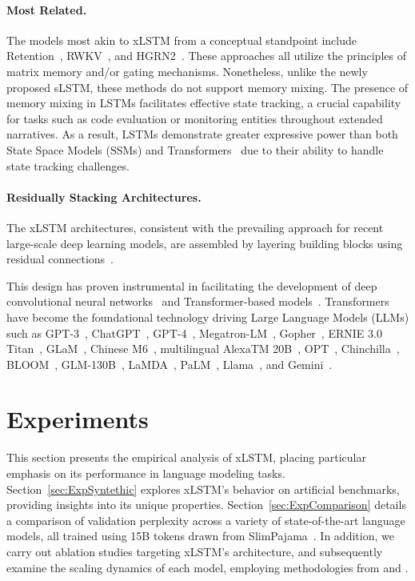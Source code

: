 \paragraph{Most Related.} The models most akin to xLSTM from a conceptual standpoint include Retention~\citep{Sun:23arxiv}, RWKV~\citep{Peng:23arxivshort,Peng:24arxivshort}, and HGRN2~\citep{Qin:24arxiv}. These approaches all utilize the principles of matrix memory and/or gating mechanisms. Nonetheless, unlike the newly proposed sLSTM, these methods do not support memory mixing. The presence of memory mixing in LSTMs facilitates effective state tracking, a crucial capability for tasks such as code evaluation or monitoring entities throughout extended narratives. As a result, LSTMs demonstrate greater expressive power than both State Space Models (SSMs) and Transformers~\citep{Merrill:24,Deletang:23} due to their ability to handle state tracking challenges.

\paragraph{Residually Stacking Architectures.} The xLSTM architectures, consistent with the prevailing approach for recent large-scale deep learning models, are assembled by layering building blocks using residual connections~\citep{Srivastava:15,He:16}.

This design has proven instrumental in facilitating the development of deep convolutional neural networks~\citep{He:16} and Transformer-based models~\citep{Vaswani:17}. Transformers have become the foundational technology driving Large Language Models (LLMs) such as GPT-3~\citep{Brown:20short}, ChatGPT~\citep{Schulman:22short}, GPT-4~\citep{Achiam:23gpt4short}, Megatron-LM~\citep{Shoeybi:19}, Gopher~\citep{Rae:21short}, ERNIE 3.0 Titan~\citep{Wang:21arxivshort}, GLaM~\citep{Du:21glamshort}, Chinese M6~\citep{Lin:21}, multilingual AlexaTM 20B~\citep{Soltan:22}, OPT~\citep{Zhang:22opt}, Chinchilla~\citep{Hoffmann:22short}, BLOOM~\citep{Scao:22arxivshort}, GLM-130B~\citep{Zeng:22arxivshort}, LaMDA~\citep{Thoppilan:22short}, PaLM~\citep{Chowdhery:22short}, Llama~\citep{Touvron:23arxiv}, and Gemini~\citep{GeminiTeam:23arxiv,Reid:24arxiv}.

\section{Experiments}
\label{sec:Exp}

This section presents the empirical analysis of xLSTM, placing particular emphasis on its performance in language modeling tasks. Section~\ref{sec:ExpSyntethic} explores xLSTM's behavior on artificial benchmarks, providing insights into its unique properties. Section~\ref{sec:ExpComparison} details a comparison of validation perplexity across a variety of state-of-the-art language models, all trained using 15B tokens drawn from SlimPajama~\citep{Soboleva:23}. In addition, we carry out ablation studies targeting xLSTM's architecture, and subsequently examine the scaling dynamics of each model, employing methodologies from \citet{Kaplan:20} and \citet{Brown:20short}. 

